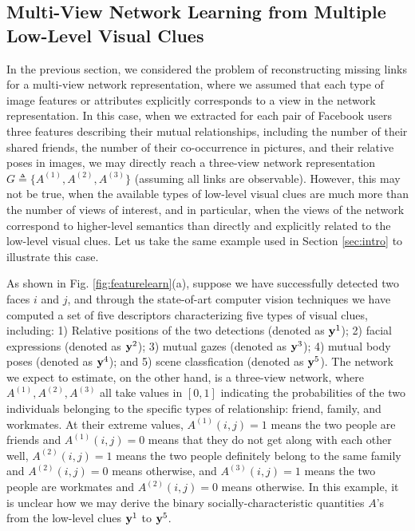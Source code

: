 \subsection{Multi-View Network Learning from Multiple Low-Level Visual Clues}
\label{sec:vis2net}

In the previous section, we considered the problem of reconstructing missing links for a multi-view network representation, where we assumed that each type of image features or attributes explicitly corresponds to a view in the network representation. In this case, when we extracted for each pair of Facebook users three features describing their mutual relationships, including the number of their shared friends, the number of their co-occurrence in pictures, and their relative poses in images, we may directly reach a three-view network representation $G\triangleq\{A^{(1)}, A^{(2)}, A^{(3)}\}$ (assuming all links are observable). However, this may not be true, when the available types of low-level visual clues are much more than the number of views of interest, and in particular, when the views of the network correspond to higher-level semantics than directly and explicitly related to the low-level visual clues. Let us take the same example used in Section \ref{sec:intro} to illustrate this case.

As shown in Fig. \ref{fig:featurelearn}(a), suppose we have successfully detected two faces $i$ and $j$, and through the state-of-art computer vision techniques we have computed a set of five descriptors characterizing five types of visual clues, including: 1) Relative positions of the two detections (denoted as ${\bf y}^1$); 2) facial expressions (denoted as ${\bf y}^2$); 3) mutual gazes (denoted as ${\bf y}^3$); 4) mutual body poses (denoted as ${\bf y}^4$); and 5) scene classfication (denoted as ${\bf y}^5$). The network we expect to estimate, on the other hand, is a three-view network, where $A^{(1)}, A^{(2)}, A^{(3)}$ all take values in $[0,1]$ indicating the probabilities of the two individuals belonging to the specific types of relationship: friend, family, and workmates. At their extreme values, $A^{(1)}(i,j)=1$ means the two people are friends and $A^{(1)}(i,j)=0$ means that they do not get along with each other well,  $A^{(2)}(i,j)=1$ means the two people definitely belong to the same family and $A^{(2)}(i,j)=0$ means otherwise, and $A^{(3)}(i,j)=1$ means the two people are workmates and $A^{(2)}(i,j)=0$ means otherwise. In this example, it is unclear how we may derive the binary socially-characteristic quantities $A$'s from the low-level clues ${\bf y}^1$ to ${\bf y}^5$.


